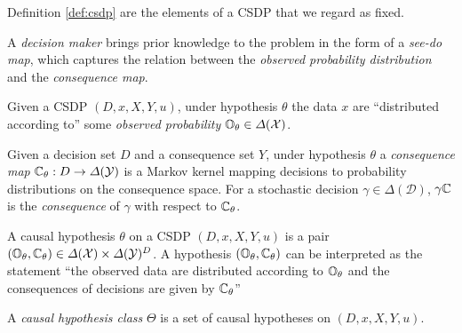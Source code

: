 Definition \ref{def:csdp} are the elements of a CSDP that we regard as fixed.

A \emph{decision maker} brings prior knowledge to the problem in the form of a \emph{see-do map}, which captures the relation between the \emph{observed probability distribution} and the \emph{consequence map}.

\begin{definition}\label{def:observed_probability}
Given a CSDP $(D,x,X,Y,u)$, under hypothesis $\theta$ the data $x$ are ``distributed according to'' some \emph{observed probability} $\mathbb{O}_\theta\in \Delta(\mathcal{X})$.
\end{definition}

\begin{definition}\label{def:conseq_map}
Given a decision set $D$ and a consequence set $Y$, under hypothesis $\theta$ a \emph{consequence map} $\mathbb{C}_\theta:D\to \Delta(\mathcal{Y})$ is a Markov kernel mapping decisions to probability distributions on the consequence space. For a stochastic decision $\gamma\in \Delta(\mathcal{D})$, $\gamma\mathbb{C}$ is the \emph{consequence} of $\gamma$ with respect to $\mathbb{C}_\theta$.
\end{definition}

\begin{definition}\label{def:hypothesis}
A causal hypothesis $\theta$ on a CSDP $(D,x,X,Y,u)$ is a pair $(\mathbb{O}_\theta,\mathbb{C}_\theta)\in \Delta(\mathcal{X})\times\Delta(\mathcal{Y})^D$. A hypothesis $(\mathbb{O}_\theta,\mathbb{C}_\theta)$ can be interpreted as the statement ``the observed data are distributed according to $\mathbb{O}_\theta$ and the consequences of decisions are given by $\mathbb{C}_\theta$''
\end{definition}

\begin{definition}\label{def:chc}
A \emph{causal hypothesis class} $\Theta$ is a set of causal hypotheses on $(D,x,X,Y,u)$.
\end{definition}

